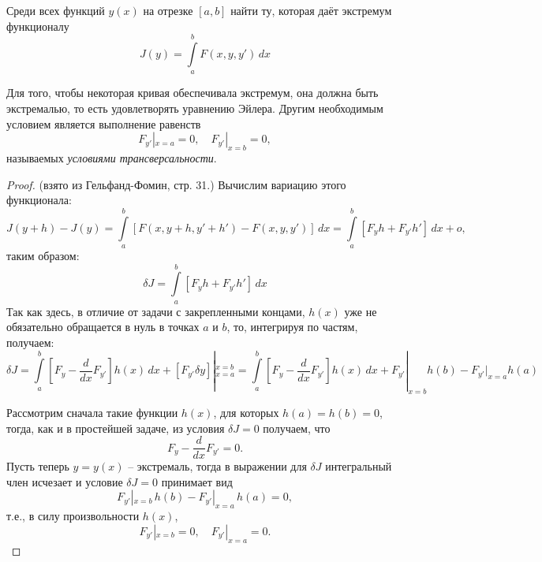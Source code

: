 
Среди всех функций $y(x)$ на отрезке $[a, b]$ найти ту, которая даёт экстремум функционалу
\[
  J(y) = \int\limits_a^b F(x, y, y') \, dx
\]

Для того, чтобы некоторая кривая обеспечивала экстремум, она должна быть экстремалью, то есть
удовлетворять уравнению Эйлера. Другим необходимым условием является выполнение
равенств
\[
  F_{y'} |_{x=a} = 0, \quad
  F_{y'} |_{x=b} = 0,
\]
называемых \emph{условиями трансверсальности}.

\begin{proof}
  (взято из Гельфанд-Фомин, стр. 31.)
  Вычислим вариацию этого функционала:
  \[
    J(y+h) - J(y) = \int\limits_a^b [ F(x, y+h, y' + h') - F(x, y, y') ] \, dx
    = \int\limits_a^b [ F_y h + F_{y'} h' ] \, dx + o,
  \]
  таким образом:
  \[
    \delta J = \int\limits_a^b [F_y h + F_{y'} h'] \, dx
  \]
  Так как здесь, в отличие от задачи с закрепленными концами, $h(x)$ уже не обязательно
  обращается в нуль в точках $a$ и $b$, то, интегрируя по частям, получаем:
  \[
    \delta J =
    \int\limits_a^b [F_y - \dfrac{d}{dx} F_{y'}] h(x) \, dx + [F_{y'} \delta y] |_{x=a}^{x=b} = 
    \int\limits_a^b [F_y-\dfrac{d}{dx} F_{y'}] h(x) \, dx + F_{y'} |_{x=b} h(b) - F_{y'} |_{x=a} h(a)
  \]

  Рассмотрим сначала такие функции $h(x)$, для которых $h(a) = h(b) = 0$, тогда, как и в
  простейшей задаче, из условия $\delta J = 0$ получаем, что
  \[
    F_y - \dfrac{d}{dx} F_{y'} = 0.
  \]
  Пусть теперь $y = y(x)$ -- экстремаль, тогда в выражении для $\delta J$ интегральный член
  исчезает и условие $\delta J = 0$ принимает вид
  \[
    F_{y'} |_{x=b} \, h(b) - F_{y'} |_{x=a} \, h(a) = 0,
  \]
  т.е., в силу произвольности $h(x)$,
  \[
    F_{y'} |_{x=b} = 0, \quad F_{y'} |_{x=a} = 0.
  \]

\end{proof}
